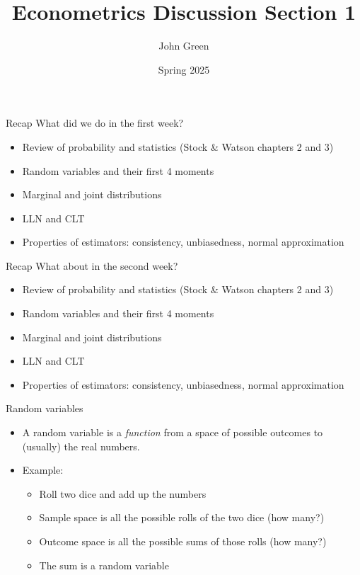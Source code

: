 \documentclass[aspectratio=169]{beamer}
\title{Econometrics Discussion Section 1}
\author{John Green}
\date{Spring 2025}
\begin{document}
\begin{frame}
    \titlepage 
\end{frame}

\begin{frame}{Recap}
    What did we do in the first week?
    \begin{itemize}
        \item Review of probability and statistics (Stock \& Watson chapters 2 and 3)
        \item Random variables and their first 4 moments
        \item Marginal and joint distributions
        \item LLN and CLT
        \item Properties of estimators: consistency, unbiasedness, normal approximation
    \end{itemize}
\end{frame}

\begin{frame}{Recap}
    What about in the second week?
    \begin{itemize}
        \item Review of probability and statistics (Stock \& Watson chapters 2 and 3)
        \item Random variables and their first 4 moments
        \item Marginal and joint distributions
        \item LLN and CLT
        \item Properties of estimators: consistency, unbiasedness, normal approximation
    \end{itemize}
\end{frame}

\begin{frame}{Random variables}
    \begin{itemize}
        \item A random variable is a \textit{function} from a space of possible outcomes to (usually) the real numbers.
        \item Example: 
        \begin{itemize}
            \item Roll two dice and add up the numbers
            \item Sample space is all the possible rolls of the two dice (how many?)
            \item Outcome space is all the possible sums of those rolls (how many?)
            \item The sum is a random variable
        \end{itemize} 
    \end{itemize}
\end{frame}
\end{document}
